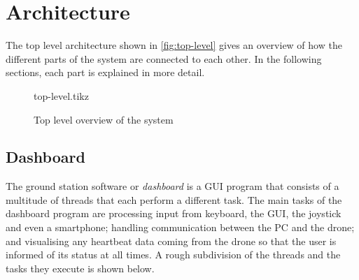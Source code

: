 \documentclass[final]{article}
\begin{document}
\section{Architecture}
The top level architecture shown in \autoref{fig:top-level} gives an overview of how the different parts of the system are connected to each other. In the following sections, each part is explained in more detail.

\begin{figure}[H]
\centering
    {top-level.tikz}
    \caption{Top level overview of the system}
    \label{fig:top-level}
\end{figure}

\subsection{Dashboard}
\label{ssec:architecture-dashboard}
The ground station software or \emph{dashboard} is a GUI program that consists of a multitude of threads that each perform a different task.
The main tasks of the dashboard program are processing input from keyboard, the GUI, the joystick and even a smartphone; handling communication between the PC and the drone; and visualising any heartbeat data coming from the drone so that the user is informed of its status at all times.
A rough subdivision of the threads and the tasks they execute is shown below.
\end{document}
